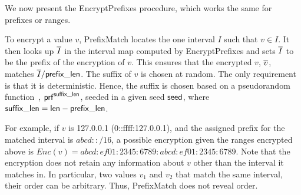 We now present the EncryptPrefixes procedure, which works the same for prefixes or ranges.



\begin{framed}
\end{framed}

To encrypt a value $v$, PrefixMatch locates the one interval $I$ such that $v \in I$. It then looks up $\overline{I}$ in the interval map computed by EncryptPrefixes and sets $\overline{I}$ to be the prefix of the encryption of $v$. This ensures that the encrypted $v$, $\overline{v}$, matches $\overline{I}/\mathsf{prefix\_len}$. The suffix of $v$ is chosen at random. The only requirement is that it is deterministic. 
Hence, the suffix is chosen based on a pseudorandom function~\cite{goldreichvolume1}, $\mathsf{prf}^{\mathsf{suffix\_len}}$, seeded in a given seed  $\mathsf{seed}$, where $\mathsf{suffix\_len} = \mathsf{len}-\mathsf{prefix\_len}$.  



For example, if $v$ is 127.0.0.1 (0::ffff:127.0.0.1), and the assigned prefix for the matched interval is $abcd::/16$, a possible encryption given the ranges encrypted above is $Enc(v) = abcd:ef01:2345:6789:abcd:ef01:2345:6789$. Note that the encryption does not retain any information about $v$ other than the interval it matches in. In particular, two values $v_1$ and $v_2$ that match the same interval, their order can be arbitrary. Thus, PrefixMatch does not reveal order.

